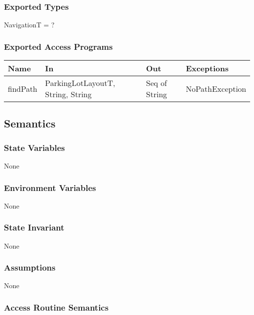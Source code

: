 \documentclass[12pt, titlepage]{article}
\begin{document}
\subsubsection{Exported Types}
NavigationT = ?

\subsubsection{Exported Access Programs}

\begin{tabular}{l l l l}
\hline
\textbf{Name} & \textbf{In} & \textbf{Out} & \textbf{Exceptions} \\
\hline
findPath & ParkingLotLayoutT, String, String & Seq of String & NoPathException\\
\hline
\end{tabular}

\subsection{Semantics}

\subsubsection{State Variables}
None

\subsubsection{Environment Variables}
None

\subsubsection{State Invariant}
None

\subsubsection{Assumptions}
None

\subsubsection{Access Routine Semantics}
\end{document}
